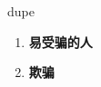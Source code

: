 
\begin{frame}
{\huge dupe}
\begin{center}
\begin{enumerate}\Large
  \item \textbf{易受骗的人}
  \item \textbf{欺骗}
\end{enumerate}
\end{center}
\end{frame}
